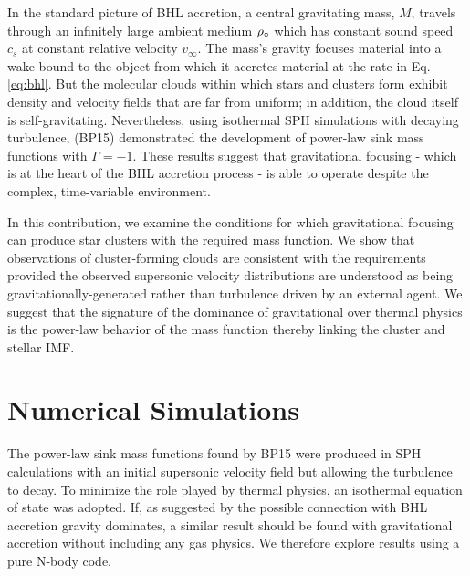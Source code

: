\documentclass[iop]{emulateapj}
\begin{document}
In the standard picture of BHL accretion, a central gravitating mass, $M$, travels through an infinitely large ambient medium $\rho_{\circ}$ which has constant sound speed $c_s$ at constant relative velocity $v_{\infty}$. The mass's gravity focuses material into a wake bound to the object from which it accretes material at the rate in Eq. \ref{eq:bhl}. 
But the molecular clouds within which stars and clusters form
exhibit density and velocity fields that are far from
uniform; in addition, the cloud itself is
self-gravitating.  Nevertheless, using isothermal SPH simulations with decaying turbulence,
\citet{ballesteros15} (BP15) demonstrated the development of power-law sink mass functions
with $\Gamma = -1$.  These results suggest that gravitational focusing - which is at the
heart of the BHL accretion process - is able to operate
despite the complex, time-variable environment.

In this contribution, we examine the conditions for which gravitational focusing
can produce star clusters with the required mass function.  We show that observations
of cluster-forming clouds are consistent with the requirements provided the observed
supersonic velocity distributions are understood as being gravitationally-generated
rather than turbulence driven by an external agent.  We suggest that the signature
of the dominance of gravitational over thermal physics is the power-law behavior
of the mass function 
thereby linking the cluster and stellar IMF. 

\section{Numerical Simulations}

The power-law sink mass functions found by
BP15 were produced in
SPH calculations with an initial supersonic velocity field
but allowing the turbulence to decay. To 
minimize the role
played by thermal physics, an isothermal equation
of state was adopted.  If, as suggested by the possible connection with BHL accretion gravity dominates, a similar
result should be found with gravitational
accretion without including any
gas physics.  We therefore explore results using
a pure N-body code.
\end{document}
